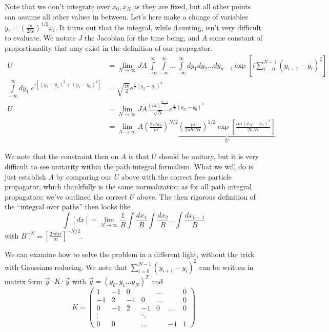 \documentclass[10pt]{report}
\begin{document}
Note that we don't integrate over $x_0, x_N$ as they are fixed, but all other points can assume all other values in between. Let's here make a change of variables $y_i = \left( \frac{m}{2\hbar\epsilon} \right)^{1/2}x_i$. It turns out that the integral, while daunting, isn't very difficult to evaluate. We notate $J$ the Jacobian for the time being, and $A$ some constant of proportionality that may exist in the definition of our propagator.
\begin{align}
    U &= \lim_{N \to \infty} JA\int\limits_{-\infty}^{\infty}\int\limits_{-\infty}^{\infty}\dots\int\limits_{-\infty}^{\infty}dy_1dy_2\dots dy_{n-1} \exp\left[ i\sum_{i=0}^{N-1}(y_{i + 1} - y_i)^2 \right]\\
    \int\limits_{-\infty}^{\infty}dy_1\;e^{i\left[ (y_2 - y_1)^2 + (y_1 - y_0)^2 \right]} &= \sqrt{\frac{i\pi}{2}}e^{\frac{i}{2}\left( y_2 - y_0 \right)^2}\\
    U &= \lim_{N \to \infty}JA\frac{(i\pi)^{\frac{N-1}{2}}}{\sqrt{N}}e^{\frac{i}{N}(y_N - y_0)^2}\\
    &= \lim_{N \to \infty}A \left( \frac{2\pi\hbar\epsilon i}{m} \right)^{N/2}\underbrace{\left( \frac{m}{2\pi\hbar i N\epsilon} \right)^{1/2}\exp\left[ \frac{im(x_N - x_0)^2}{2\hbar N\epsilon} \right]}_{U}
\end{align}

We note that the constraint then on $A$ is that $U$ should be unitary, but it is very difficult to see unitarity within the path integral formalism. What we will do is just establish $A$ by comparing our $U$ above with the correct free particle propagator, which thankfully is the same normalization as for all path integral propagators; we've outlined the correct $U$ above. The then rigorous definition of the ``integral over paths'' then looks like
\begin{equation}
    \int [dx] = \lim_{N \to \infty} \frac{1}{B}\int \frac{dx_1}{B}\int \frac{dx_2}{B}\dots \int \frac{dx_{n-1}}{B}
\end{equation}
with $B^{-N} = \left[ \frac{2\pi\hbar\epsilon i}{m} \right]^{-N/2}$. 

We can examine how to solve the problem in a different light, without the trick with Gaussians reducing. We note that $\sum_{i=0}^{N-1}(y_{i+1} - y_i)^2$ can be written in matrix form $\vec{y}\cdot K \cdot \vec{y}$ with $\vec{y} = (y_0, y_1\dots y_N)^T$ and 
\begin{equation}
    K = \begin{pmatrix} 1 & -1 & 0 &&\dots && 0\\-1 & 2 & -1 & 0 &\dots& & 0 \\ 0 & -1 & 2 & -1 & 0 & \dots & 0\\\vdots & & & \ddots & & & \\0 & 0 &&\dots &  & -1 &1 \end{pmatrix} 
\end{equation}
\end{document}
